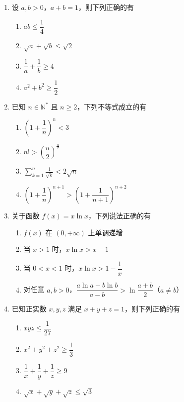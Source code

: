 \documentclass[12pt, a4paper]{ctexart}
\newcommand{\score}[1]{\hfill\makebox[2cm][l]{(#1分)}}
\begin{document}
\begin{enumerate}[resume]
\item 设 $a, b > 0$，$a + b = 1$，则下列正确的有\score{5}
\begin{enumerate}[label=\Alph*.]
\item $ab \leqslant \dfrac{1}{4}$
\item $\sqrt{a} + \sqrt{b} \leqslant \sqrt{2}$
\item $\dfrac{1}{a} + \dfrac{1}{b} \geqslant 4$
\item $a^2 + b^2 \geqslant \dfrac{1}{2}$
\end{enumerate}

\item 已知 $n \in \mathbb{N}^*$ 且 $n \geqslant 2$，下列不等式成立的有\score{5}
\begin{enumerate}[label=\Alph*.]
\item $\left(1 + \dfrac{1}{n}\right)^n < 3$
\item $n! > \left(\dfrac{n}{2}\right)^{\frac{n}{2}}$
\item $\displaystyle\sum_{k=1}^{n} \frac{1}{\sqrt{k}} < 2\sqrt{n}$
\item $\left(1 + \dfrac{1}{n}\right)^{n+1} > \left(1 + \dfrac{1}{n+1}\right)^{n+2}$
\end{enumerate}

\item 关于函数 $f(x) = x\ln x$，下列说法正确的有\score{5}
\begin{enumerate}[label=\Alph*.]
\item $f(x)$ 在 $(0, +\infty)$ 上单调递增
\item 当 $x > 1$ 时，$x\ln x > x - 1$
\item 当 $0 < x < 1$ 时，$x\ln x > 1 - \dfrac{1}{x}$
\item 对任意 $a, b > 0$，$\dfrac{a\ln a - b\ln b}{a - b} > \ln\dfrac{a+b}{2}$（$a \neq b$）
\end{enumerate}

\item 已知正实数 $x, y, z$ 满足 $x + y + z = 1$，则下列正确的有\score{5}
\begin{enumerate}[label=\Alph*.]
\item $xyz \leqslant \dfrac{1}{27}$
\item $x^2 + y^2 + z^2 \geqslant \dfrac{1}{3}$
\item $\dfrac{1}{x} + \dfrac{1}{y} + \dfrac{1}{z} \geqslant 9$
\item $\sqrt{x} + \sqrt{y} + \sqrt{z} \leqslant \sqrt{3}$
\end{enumerate}

\end{enumerate}
\end{document}

